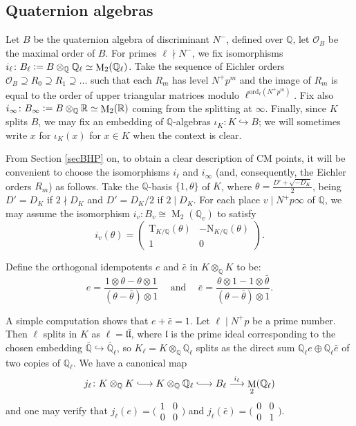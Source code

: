 \documentclass[a4paper,11pt]{amsart}
\numberwithin{equation}{section}
\theoremstyle{plain}
\theoremstyle{definition}
\theoremstyle{remark}
\newcommand{\Q}{\mathbb Q}
\newcommand{\R}{\mathbb R}
\newcommand{\defeq}{\vcentcolon=}
\DeclareMathOperator{\M}{M}
\newcommand{\ord}{\mathrm{ord}}
\newcommand{\longmono}{\mbox{\;$\lhook\joinrel\longrightarrow$\;}}
\newcommand{\mat}[4]{\left(\begin{array}{cc}#1&#2\\#3&#4\end{array}\right)}
\newcommand{\smallmat}[4]{\bigl(\begin{smallmatrix}#1&#2\\#3&#4\end{smallmatrix}\bigr)}
\begin{document}
\subsection{Quaternion algebras}\label{subsec.QuatAlg}
Let $B$ be the quaternion algebra of discriminant $N^-$, defined over $\Q$, let $\mathcal{O}_B$ be the maximal order of $B$. 
For primes $\ell\nmid N^-$, we fix isomorphisms $i_\ell\colon B_\ell\defeq B\otimes_\Q\Q_\ell\simeq\M_2(\Q_\ell)$. 
Take the sequence of Eichler orders $\mathcal{O}_B\supseteq R_0\supseteq R_1\supseteq\dots$ such that each $R_m$ has level $N^+p^m$ and the image of $R_m$ is equal to the order of upper triangular matrices modulo $\ell^{\ord_\ell(N^+p^m)}$. Fix also $i_\infty\colon B_\infty\defeq B\otimes_\Q\R\simeq\M_2(\R)$ coming from the splitting at $\infty$. Finally, since $K$ splits $B$, we may fix an embedding of $\Q$-algebras 
$\iota_K\colon K\hookrightarrow B$; we will sometimes write $x$ for $\iota_K(x)$ for $x\in K$ when the context is clear. 

From Section \ref{secBHP} on, to obtain a clear description of CM points, it will be convenient to choose the isomorphisms $i_\ell$ and $i_\infty$ (and, consequently, the Eichler orders $R_m$) as follows. Take the $\Q$-basis $\{1,\theta\}$ of $K$, where $\theta=\frac{D'+\sqrt{-D_K}}{2}$, being $D'=D_K$ if $2\nmid D_K$ and $D'=D_K/2$ if $2\mid D_K$. For each place $v\mid N^+p\infty$ of $\Q$, we may assume the isomorphism $i_v\colon B_v\cong \M_2(\Q_v)$
to satisfy
\[i_v(\theta)=\mat {\mathrm{T}_{K/\Q}(\theta)}{-\mathrm{N}_{K/\Q}(\theta)}{1}{0}.\]

Define the orthogonal idempotents $e$ and $\bar{e}$ in $K\otimes_\Q K$ to be: 
\[e=\frac{1\otimes{\theta}-\theta\otimes 1}{(\theta-\bar{\theta})\otimes 1}\hspace{15pt}\text{and}\hspace{15pt}\bar{e}=\frac{\theta\otimes 1-1\otimes\bar\theta}{(\theta-\bar{\theta})\otimes1}.\]

A simple computation shows that $e+\bar{e}=1$. 
Let $\ell\mid N^+p$ be a prime number. Then $\ell$ splits in $K$ as $\ell=\mathfrak{l}\bar{\mathfrak{l}}$, where 
$\mathfrak{l}$ is the prime ideal corresponding to the chosen embedding $\overline{\Q}\hookrightarrow\overline{\Q}_\ell$, so $K_\ell=K\otimes_\Q\Q_\ell$ splits as the direct sum $\Q_\ell e\oplus \Q_\ell \bar{e}$ of two copies of $\Q_\ell$. We have a canonical map 
\[j_\ell\colon K\otimes_\Q K\longmono K\otimes_\Q\Q_\ell\longmono B_\ell\overset{i_\ell}\longrightarrow\M_2(\Q_\ell)\] and one may verify that $j_\ell(e)=\smallmat 1000$ and $j_\ell(\bar{e})=\smallmat 0001$.  
\end{document}
